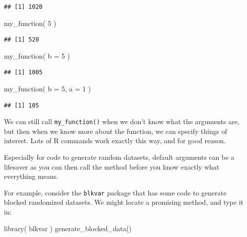 \documentclass[
]{book}
\newenvironment{Shaded}{\begin{snugshade}}{\end{snugshade}}
\newcommand{\AttributeTok}[1]{\textcolor[rgb]{0.77,0.63,0.00}{#1}}
\newcommand{\DecValTok}[1]{\textcolor[rgb]{0.00,0.00,0.81}{#1}}
\newcommand{\FunctionTok}[1]{\textcolor[rgb]{0.00,0.00,0.00}{#1}}
\newcommand{\NormalTok}[1]{#1}
\begin{document}
\begin{verbatim}
## [1] 1020
\end{verbatim}

\begin{Shaded}
\begin{Highlighting}[]
\FunctionTok{my\_function}\NormalTok{( }\DecValTok{5}\NormalTok{ )}
\end{Highlighting}
\end{Shaded}

\begin{verbatim}
## [1] 520
\end{verbatim}

\begin{Shaded}
\begin{Highlighting}[]
\FunctionTok{my\_function}\NormalTok{( }\AttributeTok{b =} \DecValTok{5}\NormalTok{ )}
\end{Highlighting}
\end{Shaded}

\begin{verbatim}
## [1] 1005
\end{verbatim}

\begin{Shaded}
\begin{Highlighting}[]
\FunctionTok{my\_function}\NormalTok{( }\AttributeTok{b =} \DecValTok{5}\NormalTok{, }\AttributeTok{a =} \DecValTok{1}\NormalTok{ )}
\end{Highlighting}
\end{Shaded}

\begin{verbatim}
## [1] 105
\end{verbatim}

We can still call \texttt{my\_function()} when we don't know what the arguments are, but then when we know more about the function, we can specify things of interest.
Lots of R commands work exactly this way, and for good reason.

Especially for code to generate random datasets, default arguments can be a lifesaver as you can then call the method before you know exactly what everything means.

For example, consider the \texttt{blkvar} package that has some code to generate blocked randomized datasets.
We might locate a promising method, and type it in:

\begin{Shaded}
\begin{Highlighting}[]
\FunctionTok{library}\NormalTok{( blkvar )}
\FunctionTok{generate\_blocked\_data}\NormalTok{()}
\end{Highlighting}
\end{Shaded}
\end{document}
